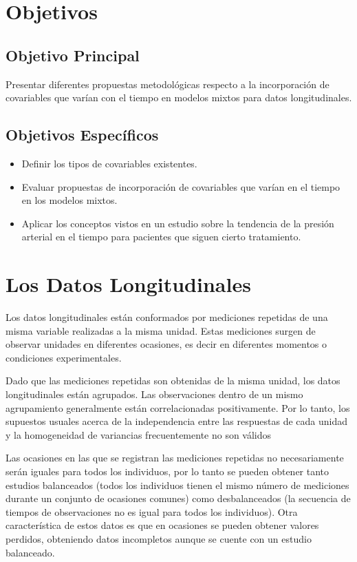 \documentclass[spanish]{article}
\numberwithin{figure}{subsection}
\numberwithin{equation}{subsection}
\numberwithin{table}{subsection}
\begin{document}
\newpage
\section{Objetivos}

\subsection{Objetivo Principal}

Presentar diferentes propuestas metodológicas respecto a la incorporación de
covariables que varían con el tiempo en modelos mixtos para datos
longitudinales.

\subsection{Objetivos Específicos}

\begin{itemize}
	\item Definir los tipos de covariables existentes.
	\item Evaluar propuestas de incorporación de covariables que varían en el
	tiempo en los modelos mixtos.
	\item Aplicar los conceptos vistos en un estudio sobre la tendencia de la
		  presión arterial en el tiempo para pacientes que siguen cierto
		  tratamiento.
\end{itemize}

\newpage
\section{Los Datos Longitudinales}

Los datos longitudinales están conformados por mediciones repetidas de una
misma variable realizadas a la misma unidad. Estas mediciones surgen de
observar unidades en diferentes ocasiones, es decir en diferentes momentos o
condiciones experimentales.

Dado que las mediciones repetidas son obtenidas de la misma unidad, los datos
longitudinales están agrupados. Las observaciones dentro de un mismo
agrupamiento generalmente están correlacionadas positivamente. Por lo tanto,
los supuestos usuales acerca de la independencia entre las respuestas de cada
unidad y la homogeneidad de variancias frecuentemente no son válidos

Las ocasiones en las que se registran las mediciones repetidas no
necesariamente serán iguales para todos los individuos, por lo tanto se pueden
obtener tanto estudios balanceados (todos los individuos tienen el mismo número
de mediciones durante un conjunto de ocasiones comunes) como desbalanceados (la
secuencia de tiempos de observaciones no es igual para todos los individuos).
Otra característica de estos datos es que en ocasiones se pueden obtener
valores perdidos, obteniendo datos incompletos aunque se cuente con un estudio
balanceado.
\end{document}
